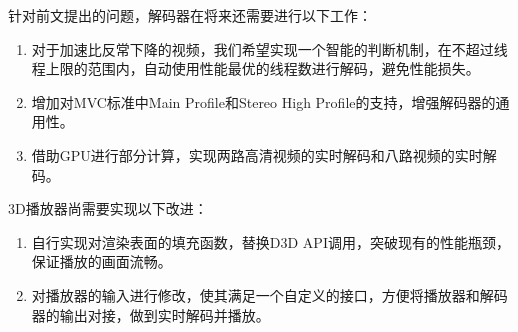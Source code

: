 针对前文提出的问题，解码器在将来还需要进行以下工作：
\begin{enumerate}
\item 对于加速比反常下降的视频，我们希望实现一个智能的判断机制，在不超过线程上限的范围内，自动使用性能最优的线程数进行解码，避免性能损失。
\item 增加对MVC标准中Main Profile和Stereo High Profile的支持，增强解码器的通用性。
\item 借助GPU进行部分计算，实现两路高清视频的实时解码和八路视频的实时解码。
\end{enumerate}

3D播放器尚需要实现以下改进：
\begin{enumerate}
\item 自行实现对渲染表面的填充函数，替换D3D API调用，突破现有的性能瓶颈，保证播放的画面流畅。
\item 对播放器的输入进行修改，使其满足一个自定义的接口，方便将播放器和解码器的输出对接，做到实时解码并播放。
\end{enumerate}

\cleardoublepage